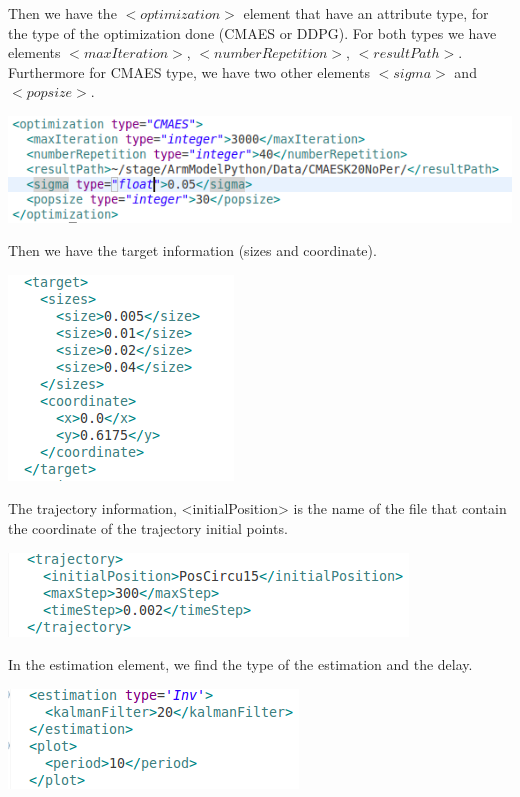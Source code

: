 \documentclass[a4paper]{article}
\begin{document}
Then we have the $<optimization>$ element that have an attribute type, for the type of the optimization done (CMAES or DDPG). For both types we have elements $<maxIteration>$, $<numberRepetition>$, $<resultPath>$.
Furthermore for CMAES type, we have two other elements $<sigma>$ and $<popsize>$.
\begin{flushleft}
\includegraphics[scale=0.5]{XMLOpti.png}
\end{flushleft}
Then we have the target information (sizes and coordinate).
\begin{flushleft}
\includegraphics[scale=0.5]{XMLTarget.png}
\end{flushleft}
The trajectory information, <initialPosition> is the name of the file that contain the coordinate of the trajectory initial points.
\begin{flushleft}
\includegraphics[scale=0.5]{XMLTraj.png}
\end{flushleft}
In the estimation element, we find the type of the estimation and the delay.  
\begin{flushleft}
\includegraphics[scale=0.5]{XMLEstim.png}
\end{flushleft}
\end{document}
